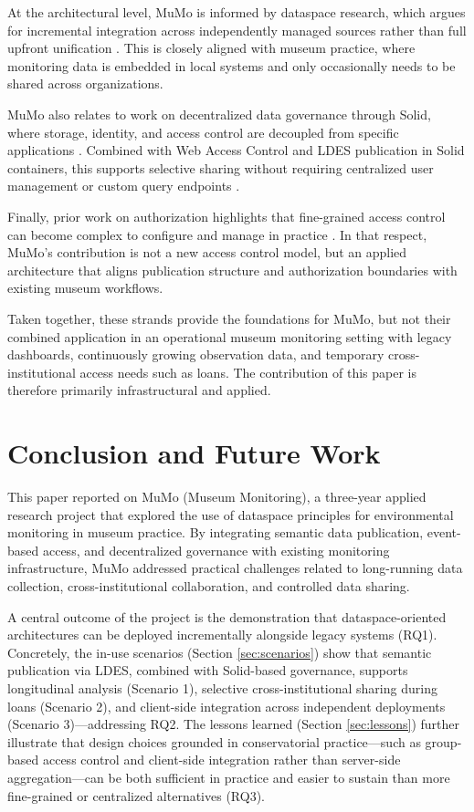 \documentclass{ceurart}
\begin{document}
At the architectural level, MuMo is informed by dataspace research,
which argues for incremental integration across independently managed
sources rather than full upfront unification
\citep{franklin2005databases, halevy2006principles}. This is closely
aligned with museum practice, where monitoring data is embedded in local
systems and only occasionally needs to be shared across organizations.

MuMo also relates to work on decentralized data governance through
Solid, where storage, identity, and access control are decoupled from
specific applications \citep{solid_24, solid_25}. Combined with Web
Access Control and LDES publication in Solid containers, this supports
selective sharing without requiring centralized user management or
custom query endpoints \citep{solidprotocol2022, slabbinck2023linked}.

Finally, prior work on authorization highlights that fine-grained access
control can become complex to configure and manage in practice
\citep{hu2014guide}. In that respect, MuMo's contribution is not a new
access control model, but an applied architecture that aligns
publication structure and authorization boundaries with existing museum
workflows.

Taken together, these strands provide the foundations for MuMo, but not
their combined application in an operational museum monitoring setting
with legacy dashboards, continuously growing observation data, and
temporary cross-institutional access needs such as loans. The
contribution of this paper is therefore primarily infrastructural and
applied.

\section{Conclusion and Future Work}\label{sec:conclusion}

This paper reported on MuMo (Museum Monitoring), a three-year applied
research project that explored the use of dataspace principles for
environmental monitoring in museum practice. By integrating semantic
data publication, event-based access, and decentralized governance with
existing monitoring infrastructure, MuMo addressed practical challenges
related to long-running data collection, cross-institutional
collaboration, and controlled data sharing.

A central outcome of the project is the demonstration that
dataspace-oriented architectures can be deployed incrementally alongside
legacy systems (RQ1). Concretely, the in-use scenarios (Section
\ref{sec:scenarios}) show that semantic publication via LDES, combined
with Solid-based governance, supports longitudinal analysis (Scenario
1), selective cross-institutional sharing during loans (Scenario 2), and
client-side integration across independent deployments (Scenario
3)---addressing RQ2. The lessons learned (Section \ref{sec:lessons})
further illustrate that design choices grounded in conservatorial
practice---such as group-based access control and client-side
integration rather than server-side aggregation---can be both sufficient
in practice and easier to sustain than more fine-grained or centralized
alternatives (RQ3).
\end{document}
